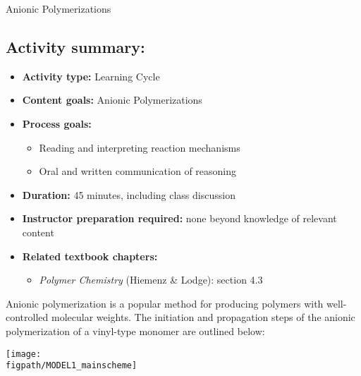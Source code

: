 \begin{activity}{Anionic Polymerizations}
\begin{instructornotes}
	\subsection*{Activity summary:}
	\begin{itemize}
		\item \textbf{Activity type:} Learning Cycle
		\item \textbf{Content goals:} Anionic Polymerizations
		\item \textbf{Process goals:} %
			\begin{itemize}
				\item Reading and interpreting reaction mechanisms
				\item Oral and written communication of reasoning
			\end{itemize}
		\item \textbf{Duration:} 45 minutes, including class discussion
		\item \textbf{Instructor preparation required:} none beyond knowledge of relevant content
		\item \textbf{Related textbook chapters:}
			\begin{itemize}
				\item \emph{Polymer Chemistry} (Hiemenz \& Lodge): section 4.3
			\end{itemize}
	\end{itemize}
	
\end{instructornotes}


\begin{model}
	\label{\labelbase:mdl:anionic}

	Anionic polymerization is a popular method for producing polymers with well-controlled molecular weights.  The initiation and propagation steps of the anionic polymerization of a vinyl-type monomer are outlined below:
	
	\centerline{\texttt{[image: \\figpath/MODEL1\_mainscheme]}}
	
\end{model}


\begin{ctqs}


\end{ctqs}
\end{activity}
